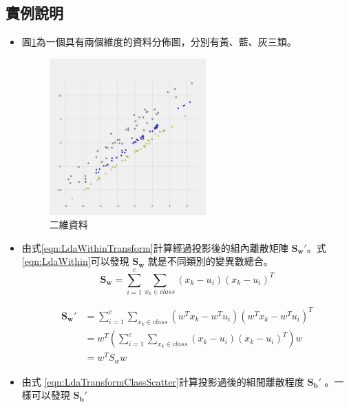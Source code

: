\subsection{實例說明}
\begin{itemize}
	\item
	      圖\ref{fig:LdaDemostrate}為一個具有兩個維度的資料分佈圖，分別有黃、藍、灰三類。
	      \begin{figure}[h]
		      \centering
		      \includegraphics[width=6cm]{pic/lda_dataset.png}
		      \caption{二維資料}
		      \label{fig:LdaDemostrate}
	      \end{figure}


	\item
	      由式\ref{eqn:LdaWithinTransform}計算經過投影後的組內離散矩陣 \(\mathbf{{S_w}'}\)。式 \ref{eqn:LdaWithin}可以發現 \(\mathbf{S_w}\) 就是不同類別的變異數總合。
	      \begin{equation}
		      \label{eqn:LdaWithin}
		      \mathbf{S_w}  =\sum_{i=1}^{c} \sum^{}_{x_k\in class}  (x_k - u_i)(x_k-u_i)^T
	      \end{equation}

	      \begin{equation}
		      \label{eqn:LdaWithinTransform}
		      \begin{aligned}
			      \mathbf{{S_w}'} & =\sum_{i=1}^{c} \sum^{}_{x_k\in class}  (w^Tx_k - w^Tu_i)(w^Tx_k-w^Tu_i)^T
			      \\& =w^T(\sum_{i=1}^{c} \sum^{}_{x_k\in class}  (x_k - u_i)(x_k-u_i)^T)w
			      \\& =w^TS_ww
		      \end{aligned}
	      \end{equation}


	\item
	      由式 \ref{eqn:LdaTransformClassScatter}計算投影過後的組間離散程度 \(\mathbf{{S_b}'}\) 。一樣可以發現 \(\mathbf{{S_b}'}\)


\end{itemize}
